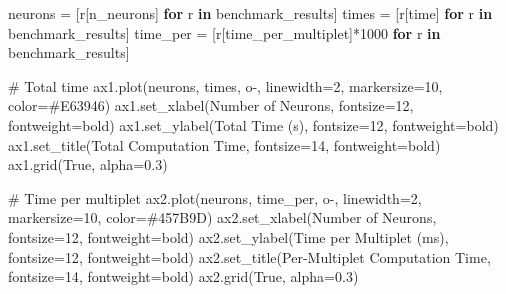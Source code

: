 \documentclass[
  11pt,
  letterpaper,
  oneside,
  openany]{book}
\newenvironment{Shaded}{\begin{snugshade}}{\end{snugshade}}
\newcommand{\CommentTok}[1]{\textcolor[rgb]{0.37,0.37,0.37}{#1}}
\newcommand{\ControlFlowTok}[1]{\textcolor[rgb]{0.00,0.23,0.31}{\textbf{#1}}}
\newcommand{\DecValTok}[1]{\textcolor[rgb]{0.68,0.00,0.00}{#1}}
\newcommand{\FloatTok}[1]{\textcolor[rgb]{0.68,0.00,0.00}{#1}}
\newcommand{\KeywordTok}[1]{\textcolor[rgb]{0.00,0.23,0.31}{\textbf{#1}}}
\newcommand{\NormalTok}[1]{\textcolor[rgb]{0.00,0.23,0.31}{#1}}
\newcommand{\OperatorTok}[1]{\textcolor[rgb]{0.37,0.37,0.37}{#1}}
\newcommand{\StringTok}[1]{\textcolor[rgb]{0.13,0.47,0.30}{#1}}
\newcommand{\VariableTok}[1]{\textcolor[rgb]{0.07,0.07,0.07}{#1}}
\begin{document}
\begin{Shaded}
\begin{Highlighting}[]
\NormalTok{neurons }\OperatorTok{=}\NormalTok{ [r[}\StringTok{\textquotesingle{}n\_neurons\textquotesingle{}}\NormalTok{] }\ControlFlowTok{for}\NormalTok{ r }\KeywordTok{in}\NormalTok{ benchmark\_results]}
\NormalTok{times }\OperatorTok{=}\NormalTok{ [r[}\StringTok{\textquotesingle{}time\textquotesingle{}}\NormalTok{] }\ControlFlowTok{for}\NormalTok{ r }\KeywordTok{in}\NormalTok{ benchmark\_results]}
\NormalTok{time\_per }\OperatorTok{=}\NormalTok{ [r[}\StringTok{\textquotesingle{}time\_per\_multiplet\textquotesingle{}}\NormalTok{]}\OperatorTok{*}\DecValTok{1000} \ControlFlowTok{for}\NormalTok{ r }\KeywordTok{in}\NormalTok{ benchmark\_results]}

\CommentTok{\# Total time}
\NormalTok{ax1.plot(neurons, times, }\StringTok{\textquotesingle{}o{-}\textquotesingle{}}\NormalTok{, linewidth}\OperatorTok{=}\DecValTok{2}\NormalTok{, markersize}\OperatorTok{=}\DecValTok{10}\NormalTok{, color}\OperatorTok{=}\StringTok{\textquotesingle{}\#E63946\textquotesingle{}}\NormalTok{)}
\NormalTok{ax1.set\_xlabel(}\StringTok{\textquotesingle{}Number of Neurons\textquotesingle{}}\NormalTok{, fontsize}\OperatorTok{=}\DecValTok{12}\NormalTok{, fontweight}\OperatorTok{=}\StringTok{\textquotesingle{}bold\textquotesingle{}}\NormalTok{)}
\NormalTok{ax1.set\_ylabel(}\StringTok{\textquotesingle{}Total Time (s)\textquotesingle{}}\NormalTok{, fontsize}\OperatorTok{=}\DecValTok{12}\NormalTok{, fontweight}\OperatorTok{=}\StringTok{\textquotesingle{}bold\textquotesingle{}}\NormalTok{)}
\NormalTok{ax1.set\_title(}\StringTok{\textquotesingle{}Total Computation Time\textquotesingle{}}\NormalTok{, fontsize}\OperatorTok{=}\DecValTok{14}\NormalTok{, fontweight}\OperatorTok{=}\StringTok{\textquotesingle{}bold\textquotesingle{}}\NormalTok{)}
\NormalTok{ax1.grid(}\VariableTok{True}\NormalTok{, alpha}\OperatorTok{=}\FloatTok{0.3}\NormalTok{)}

\CommentTok{\# Time per multiplet}
\NormalTok{ax2.plot(neurons, time\_per, }\StringTok{\textquotesingle{}o{-}\textquotesingle{}}\NormalTok{, linewidth}\OperatorTok{=}\DecValTok{2}\NormalTok{, markersize}\OperatorTok{=}\DecValTok{10}\NormalTok{, color}\OperatorTok{=}\StringTok{\textquotesingle{}\#457B9D\textquotesingle{}}\NormalTok{)}
\NormalTok{ax2.set\_xlabel(}\StringTok{\textquotesingle{}Number of Neurons\textquotesingle{}}\NormalTok{, fontsize}\OperatorTok{=}\DecValTok{12}\NormalTok{, fontweight}\OperatorTok{=}\StringTok{\textquotesingle{}bold\textquotesingle{}}\NormalTok{)}
\NormalTok{ax2.set\_ylabel(}\StringTok{\textquotesingle{}Time per Multiplet (ms)\textquotesingle{}}\NormalTok{, fontsize}\OperatorTok{=}\DecValTok{12}\NormalTok{, fontweight}\OperatorTok{=}\StringTok{\textquotesingle{}bold\textquotesingle{}}\NormalTok{)}
\NormalTok{ax2.set\_title(}\StringTok{\textquotesingle{}Per{-}Multiplet Computation Time\textquotesingle{}}\NormalTok{, fontsize}\OperatorTok{=}\DecValTok{14}\NormalTok{, fontweight}\OperatorTok{=}\StringTok{\textquotesingle{}bold\textquotesingle{}}\NormalTok{)}
\NormalTok{ax2.grid(}\VariableTok{True}\NormalTok{, alpha}\OperatorTok{=}\FloatTok{0.3}\NormalTok{)}


\end{Highlighting}
\end{Shaded}
\end{document}
